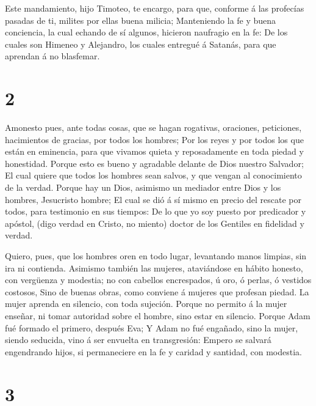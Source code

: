  Este mandamiento, hijo Timoteo, te encargo, para que,
conforme á las profecías pasadas de ti, milites por ellas buena milicia;
 Manteniendo la fe y buena conciencia, la cual echando de
sí algunos, hicieron naufragio en la fe:  De los cuales son
Himeneo y Alejandro, los cuales entregué á Satanás, para que aprendan á
no blasfemar.

\hypertarget{section-1}{%
\section{2}\label{section-1}}

 Amonesto pues, ante todas cosas, que se hagan rogativas,
oraciones, peticiones, hacimientos de gracias, por todos los hombres;
 Por los reyes y por todos los que están en eminencia, para
que vivamos quieta y reposadamente en toda piedad y honestidad.
 Porque esto es bueno y agradable delante de Dios nuestro
Salvador;  El cual quiere que todos los hombres sean salvos,
y que vengan al conocimiento de la verdad.  Porque hay un
Dios, asimismo un mediador entre Dios y los hombres, Jesucristo hombre;
 El cual se dió á sí mismo en precio del rescate por todos,
para testimonio en sus tiempos:  De lo que yo soy puesto por
predicador y apóstol, (digo verdad en Cristo, no miento) doctor de los
Gentiles en fidelidad y verdad.

 Quiero, pues, que los hombres oren en todo lugar,
levantando manos limpias, sin ira ni contienda.  Asimismo
también las mujeres, ataviándose en hábito honesto, con vergüenza y
modestia; no con cabellos encrespados, ú oro, ó perlas, ó vestidos
costosos,  Sino de buenas obras, como conviene á mujeres
que profesan piedad.  La mujer aprenda en silencio, con
toda sujeción.  Porque no permito á la mujer enseñar, ni
tomar autoridad sobre el hombre, sino estar en silencio. 
Porque Adam fué formado el primero, después Eva;  Y Adam no
fué engañado, sino la mujer, siendo seducida, vino á ser envuelta en
transgresión:  Empero se salvará engendrando hijos, si
permaneciere en la fe y caridad y santidad, con modestia.

\hypertarget{section-2}{%
\section{3}\label{section-2}}

